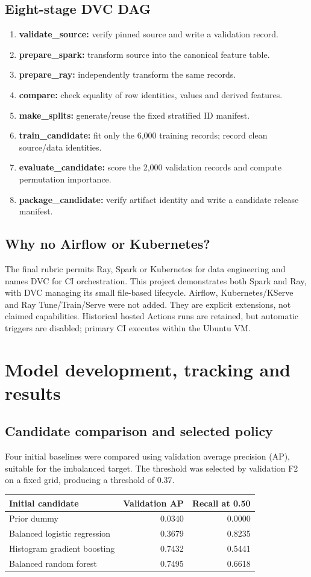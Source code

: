 \documentclass[11pt,a4paper]{article}
\begin{document}
\subsection{Eight-stage DVC DAG}
\begin{enumerate}
\item \textbf{validate\_source:} verify pinned source and write a validation record.
\item \textbf{prepare\_spark:} transform source into the canonical feature table.
\item \textbf{prepare\_ray:} independently transform the same records.
\item \textbf{compare:} check equality of row identities, values and derived features.
\item \textbf{make\_splits:} generate/reuse the fixed stratified ID manifest.
\item \textbf{train\_candidate:} fit only the 6,000 training records; record clean source/data identities.
\item \textbf{evaluate\_candidate:} score the 2,000 validation records and compute permutation importance.
\item \textbf{package\_candidate:} verify artifact identity and write a candidate release manifest.
\end{enumerate}
\subsection{Why no Airflow or Kubernetes?}
The final rubric permits Ray, Spark or Kubernetes for data engineering and names DVC for CI orchestration. This project demonstrates both Spark and Ray, with DVC managing its small file-based lifecycle. Airflow, Kubernetes/KServe and Ray Tune/Train/Serve were not added. They are explicit extensions, not claimed capabilities. Historical hosted Actions runs are retained, but automatic triggers are disabled; primary CI executes within the Ubuntu VM.
\clearpage
\section{Model development, tracking and results}
\subsection{Candidate comparison and selected policy}
Four initial baselines were compared using validation average precision (AP), suitable for the imbalanced target. The threshold was selected by validation F2 on a fixed grid, producing a threshold of 0.37.
\par
\begin{tabularx}{\linewidth}{@{}Yrr@{}}\toprule
Initial candidate & Validation AP & Recall at 0.50 \\\midrule
Prior dummy & 0.0340 & 0.0000 \\
Balanced logistic regression & 0.3679 & 0.8235 \\
Histogram gradient boosting & 0.7432 & 0.5441 \\
Balanced random forest & 0.7495 & 0.6618 \\\bottomrule
\end{tabularx}
\par
\end{document}

